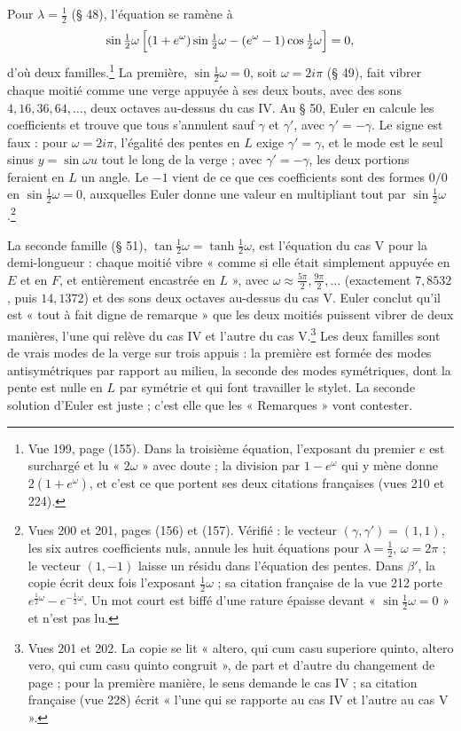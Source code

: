 \documentclass[11pt,a4paper]{article}
\begin{document}
Pour $\lambda=\frac12$ (§ 48), l'équation se ramène à
\[
\sin\tfrac12\omega\,\Bigl[(1+e^\omega)\sin\tfrac12\omega-(e^\omega-1)\cos\tfrac12\omega\Bigr]=0,
\]
d'où deux familles.\footnote{Vue 199, page (155). Dans la troisième équation, l'exposant du premier $e$ est surchargé et lu « $2\omega$ » avec doute ; la division par $1-e^\omega$ qui y mène donne $2(1+e^\omega)$, et c'est ce que portent ses deux citations françaises (vues 210 et 224).} La première, $\sin\frac12\omega=0$, soit $\omega=2i\pi$ (§ 49), fait vibrer chaque moitié comme une verge appuyée à ses deux bouts, avec des sons $4,16,36,64,\dots$, deux octaves au-dessus du cas IV. Au § 50, Euler en calcule les coefficients et trouve que tous s'annulent sauf $\gamma$ et $\gamma'$, avec $\gamma'=-\gamma$. Le signe est faux : pour $\omega=2i\pi$, l'égalité des pentes en $L$ exige $\gamma'=\gamma$, et le mode est le seul sinus $y=\sin\omega u$ tout le long de la verge ; avec $\gamma'=-\gamma$, les deux portions feraient en $L$ un angle. Le $-1$ vient de ce que ces coefficients sont des formes $0/0$ en $\sin\frac12\omega=0$, auxquelles Euler donne une valeur en multipliant tout par $\sin\frac12\omega$.\footnote{Vues 200 et 201, pages (156) et (157). Vérifié : le vecteur $(\gamma,\gamma')=(1,1)$, les six autres coefficients nuls, annule les huit équations pour $\lambda=\frac12$, $\omega=2\pi$ ; le vecteur $(1,-1)$ laisse un résidu dans l'équation des pentes. Dans $\beta'$, la copie écrit deux fois l'exposant $\frac12\omega$ ; sa citation française de la vue 212 porte $e^{\frac12\omega}-e^{-\frac12\omega}$. Un mot court est biffé d'une rature épaisse devant « $\sin\frac12\omega=0$ » et n'est pas lu.}

La seconde famille (§ 51), $\tan\frac12\omega=\tanh\frac12\omega$, est l'équation du cas V pour la demi-longueur : chaque moitié vibre « comme si elle était simplement appuyée en $E$ et en $F$, et entièrement encastrée en $L$ », avec $\omega\approx\frac{5\pi}{2},\frac{9\pi}{2},\dots$ (exactement $7{,}8532$, puis $14{,}1372$) et des sons deux octaves au-dessus du cas V. Euler conclut qu'il est « tout à fait digne de remarque » que les deux moitiés puissent vibrer de deux manières, l'une qui relève du cas IV et l'autre du cas V.\footnote{Vues 201 et 202. La copie se lit « altero, qui cum casu superiore quinto, altero vero, qui cum casu quinto congruit », de part et d'autre du changement de page ; pour la première manière, le sens demande le cas IV ; sa citation française (vue 228) écrit « l'une qui se rapporte au cas IV et l'autre au cas V ».} Les deux familles sont de vrais modes de la verge sur trois appuis : la première est formée des modes antisymétriques par rapport au milieu, la seconde des modes symétriques, dont la pente est nulle en $L$ par symétrie et qui font travailler le stylet. La seconde solution d'Euler est juste ; c'est elle que les « Remarques » vont contester.
\end{document}
